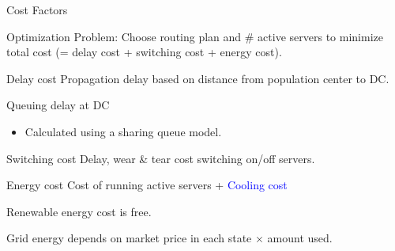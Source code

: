 \documentclass[xcolor=dvipsnames]{beamer}
\begin{document}
\begin{frame}{Cost Factors}

 Optimization Problem: Choose routing plan and \# active servers to minimize total cost (= delay cost + switching cost + energy cost).

\begin{block}{Delay cost}
 Propagation delay based on distance from population center to DC. 

Queuing delay at DC
		\begin{itemize} \item Calculated using a sharing queue model. \end{itemize}
\end{block}

\begin{block}{Switching cost}
Delay, wear \& tear cost switching on/off servers. %
\end{block}

\begin{block}{Energy cost}
Cost of running active servers + \textcolor{blue}{Cooling cost} 

Renewable energy cost is free.

Grid energy depends on market price in each state $\times$ amount used. 
\end{block}

\end{frame}
\end{document}
